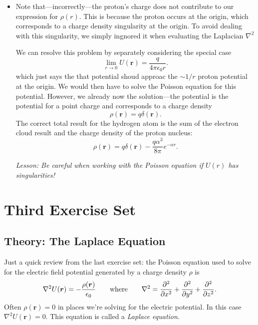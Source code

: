 \documentclass[11pt, a4paper]{article}
\newcommand{\eqtext}[1]{\qquad \text{#1} \qquad}
\renewcommand{\vec}[1]{\bm{#1}} %
\renewcommand{\r}{\vec{r}}
\newcommand{\ee}{\epsilon_{0}}  %
\renewcommand{\laplacian}{\nabla^{2}}
\begin{document}
\begin{itemize}
    \item Note that---incorrectly---the proton's charge does not contribute to our expression for $ \rho(r) $. This is because the proton occurs at the origin, which corresponds to a charge density singularity at the origin. To avoid dealing with this singularity, we simply ingnored it when evaluating the Laplacian $ \laplacian $

	
	We can resolve this problem by separately considering the special case
	\begin{equation*}
		\lim_{r\to 0}U(\r) = \frac{q}{4\pi \ee r}.
	\end{equation*}
	which just says the that potential shoud approac the $ \sim 1/r $ proton potential at the origin. We would then have to solve the Poisson equation for this potential. However, we already now the solution---the potential is the potential for a point charge and corresponds to a charge density
	\begin{equation*}
		\rho(\r) = q \delta(\r).
	\end{equation*}
	The correct total result for the hydrogen atom is the sum of the electron cloud result and the charge density of the proton nucleus:
	\begin{equation*}
		\rho(\r) = q \delta(\r) - \frac{q\alpha^{3}}{8 \pi}e^{-\alpha r}.
	\end{equation*}
	
	\textit{Lesson: Be careful when working with the Poisson equation if $ U(r) $ has singularities!}
	
\end{itemize}

\section{Third Exercise Set}

\subsection{Theory: The Laplace Equation}
Just a quick review from the last exercise set: the Poisson equation used to solve for the electric field potential generated by a charge density $ \rho $ is
\begin{equation*}
	\nabla^{2}U(\r) = - \frac{\rho(\r)}{\ee} \eqtext{where} \laplacian = \pdv[2]{}{x} + \pdv[2]{}{y} + \pdv[2]{}{z}.
\end{equation*}
Often $ \rho(\r) = 0 $ in places we're solving for the electric potential. In this case $ \laplacian U(\r) = 0 $. This equation is called a \textit{Laplace equation}.
\end{document}
